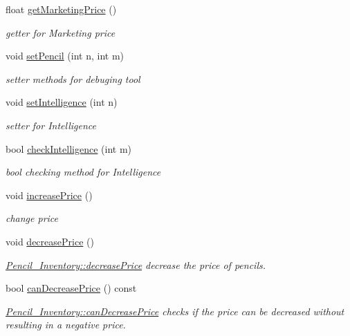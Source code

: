 \begin{DoxyCompactItemize}
float \mbox{\hyperlink{classPencil__Inventory_ac0b21fc472bded9fcdb62ce54b9ef631}{get\+Marketing\+Price}} ()
\begin{DoxyCompactList}\small\item\em getter for Marketing price \end{DoxyCompactList}\item 
void \mbox{\hyperlink{classPencil__Inventory_a599c6cab8ddaefc18a4113669b21f7d6}{set\+Pencil}} (int n, int m)
\begin{DoxyCompactList}\small\item\em setter methods for debuging tool \end{DoxyCompactList}\item 
void \mbox{\hyperlink{classPencil__Inventory_a76b13decdc0fafbf894b853da7d20321}{set\+Intelligence}} (int n)
\begin{DoxyCompactList}\small\item\em setter for Intelligence \end{DoxyCompactList}\item 
bool \mbox{\hyperlink{classPencil__Inventory_a8d786909be377e03da78532606f59880}{check\+Intelligence}} (int m)
\begin{DoxyCompactList}\small\item\em bool checking method for Intelligence \end{DoxyCompactList}\item 
void \mbox{\hyperlink{classPencil__Inventory_a7c9e758743530d09b95cd691181d078f}{increase\+Price}} ()
\begin{DoxyCompactList}\small\item\em change price \end{DoxyCompactList}\item 
void \mbox{\hyperlink{classPencil__Inventory_a711d64e733cd5b67ea3aeb0ccdda0870}{decrease\+Price}} ()
\begin{DoxyCompactList}\small\item\em \mbox{\hyperlink{classPencil__Inventory_a711d64e733cd5b67ea3aeb0ccdda0870}{Pencil\+\_\+\+Inventory\+::decrease\+Price}} decrease the price of pencils. \end{DoxyCompactList}\item 
bool \mbox{\hyperlink{classPencil__Inventory_a5c8d580bd32a2ef4b2196da7570203bf}{can\+Decrease\+Price}} () const
\begin{DoxyCompactList}\small\item\em \mbox{\hyperlink{classPencil__Inventory_a5c8d580bd32a2ef4b2196da7570203bf}{Pencil\+\_\+\+Inventory\+::can\+Decrease\+Price}} checks if the price can be decreased without resulting in a negative price. \end{DoxyCompactList}\item 

\end{DoxyCompactItemize}
